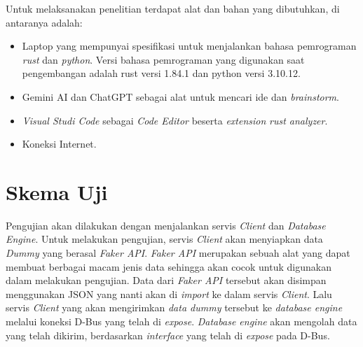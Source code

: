 Untuk melaksanakan penelitian terdapat alat dan bahan yang dibutuhkan, di antaranya 
adalah:
\begin{itemize}
	\item {
    Laptop yang mempunyai spesifikasi untuk menjalankan bahasa pemrograman \emph{rust} dan \emph{python}. Versi bahasa
    pemrograman yang digunakan saat pengembangan adalah rust versi 1.84.1 dan python versi 3.10.12.
  }
	\item {
    Gemini AI dan ChatGPT sebagai alat untuk mencari ide dan \emph{brainstorm}.
  }
	\item {
    \emph{Visual Studi Code} sebagai \emph{Code Editor} beserta \emph{extension} \emph{rust analyzer}.
  }
	\item {
    Koneksi Internet.
  }
 
\end{itemize}


\section{Skema Uji}

Pengujian akan dilakukan dengan menjalankan servis \emph{Client} dan \emph{Database Engine}.
Untuk melakukan pengujian, servis \emph{Client} akan menyiapkan data \emph{Dummy} yang berasal \emph{Faker API}.
\emph{Faker API} merupakan sebuah alat yang dapat membuat berbagai macam jenis data sehingga akan cocok
untuk digunakan dalam melakukan pengujian. Data dari \emph{Faker API} tersebut akan disimpan 
menggunakan JSON yang nanti akan di \emph{import} ke dalam servis \emph{Client}. Lalu servis \emph{Client} 
yang akan mengirimkan \emph{data dummy} tersebut ke \emph{database engine} melalui koneksi D-Bus yang 
telah di \emph{expose}. \emph{Database engine} akan mengolah data yang telah dikirim, berdasarkan \emph{interface}  
yang telah di \emph{expose} pada D-Bus.